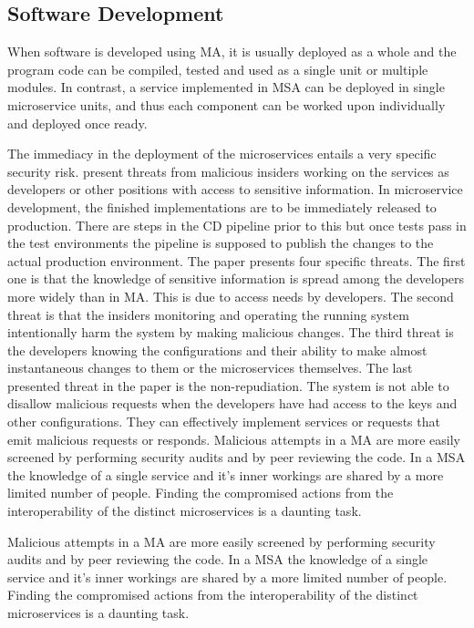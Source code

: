 \subsection{Software Development}
\begin{sloppypar}
    When software is developed using MA, it is usually deployed as a whole and 
    the program code can be compiled, tested and used as a single unit or 
    multiple modules. In contrast, a service implemented in MSA 
    can be deployed in single microservice units, and thus each component can 
    be worked upon individually and deployed once ready. 
\end{sloppypar}
\begin{sloppypar}
    The immediacy in the deployment of the microservices entails a very specific 
    security risk. \citet{integinside} present threats from malicious insiders 
    working on the services as developers or other positions with access to 
    sensitive information. In microservice development, the finished 
    implementations are to be immediately released to production. There are 
    steps in the CD pipeline prior to this but once tests pass in the test 
    environments the pipeline is supposed to publish the changes to the actual 
    production environment. The paper presents four specific threats. The first 
    one is that the knowledge of sensitive information is spread among the 
    developers more widely than in MA. This is due to access needs by 
    developers. The second threat is that the insiders monitoring and operating 
    the running system intentionally harm the system by making malicious 
    changes. The third threat is the developers knowing the configurations and 
    their ability to make almost instantaneous changes to them or the 
    microservices themselves. The last presented threat in the paper is the 
    non-repudiation. The system is not able to disallow malicious requests when 
    the developers have had access to the keys and other configurations. They 
    can effectively implement services or requests that emit malicious requests 
    or responds. Malicious attempts in a MA are more easily screened by 
    performing security audits and by peer reviewing the code. In a MSA the 
    knowledge of a single service and it’s inner workings are shared by a more 
    limited number of people. Finding the compromised actions from the 
    interoperability of the distinct microservices is a daunting task.
\end{sloppypar}
\begin{sloppypar}
    Malicious attempts in a MA are more easily screened by performing security
    audits and by peer reviewing the code. In a MSA the knowledge of a single 
    service and it's inner workings are shared by a more limited number of people.
    Finding the compromised actions from the interoperability of the distinct 
    microservices is a daunting task.
\end{sloppypar}

